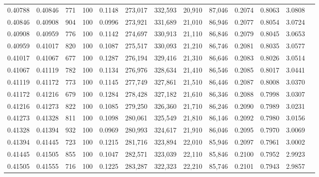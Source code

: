 \begin{tabular}{rrrrrrrrrrrrr}
0.40788 & 0.40846 &   771 & 100 &                                     0.1148 & 273,017 & 332,593 &  20,910 &  87,046 & 0.2074 & 0.8063 & 3.0808 \\
0.40846 & 0.40908 &   904 & 100 &                                     0.0996 & 273,921 & 331,689 &  21,010 &  86,946 & 0.2077 & 0.8054 & 3.0724 \\
0.40908 & 0.40959 &   776 & 100 &                                     0.1142 & 274,697 & 330,913 &  21,110 &  86,846 & 0.2079 & 0.8045 & 3.0653 \\
0.40959 & 0.41017 &   820 & 100 &                                     0.1087 & 275,517 & 330,093 &  21,210 &  86,746 & 0.2081 & 0.8035 & 3.0577 \\
0.41017 & 0.41067 &   677 & 100 &                                     0.1287 & 276,194 & 329,416 &  21,310 &  86,646 & 0.2083 & 0.8026 & 3.0514 \\
0.41067 & 0.41119 &   782 & 100 &                                     0.1134 & 276,976 & 328,634 &  21,410 &  86,546 & 0.2085 & 0.8017 & 3.0441 \\
0.41119 & 0.41172 &   773 & 100 &                                     0.1145 & 277,749 & 327,861 &  21,510 &  86,446 & 0.2087 & 0.8008 & 3.0370 \\
0.41172 & 0.41216 &   679 & 100 &                                     0.1284 & 278,428 & 327,182 &  21,610 &  86,346 & 0.2088 & 0.7998 & 3.0307 \\
0.41216 & 0.41273 &   822 & 100 &                                     0.1085 & 279,250 & 326,360 &  21,710 &  86,246 & 0.2090 & 0.7989 & 3.0231 \\
0.41273 & 0.41328 &   811 & 100 &                                     0.1098 & 280,061 & 325,549 &  21,810 &  86,146 & 0.2092 & 0.7980 & 3.0156 \\
0.41328 & 0.41394 &   932 & 100 &                                     0.0969 & 280,993 & 324,617 &  21,910 &  86,046 & 0.2095 & 0.7970 & 3.0069 \\
0.41394 & 0.41445 &   723 & 100 &                                     0.1215 & 281,716 & 323,894 &  22,010 &  85,946 & 0.2097 & 0.7961 & 3.0002 \\
0.41445 & 0.41505 &   855 & 100 &                                     0.1047 & 282,571 & 323,039 &  22,110 &  85,846 & 0.2100 & 0.7952 & 2.9923 \\
0.41505 & 0.41555 &   716 & 100 &                                     0.1225 & 283,287 & 322,323 &  22,210 &  85,746 & 0.2101 & 0.7943 & 2.9857 \\

\end{tabular}
